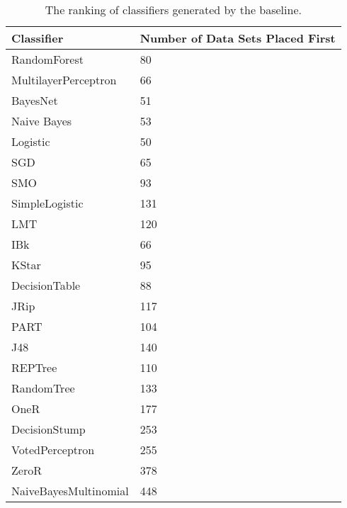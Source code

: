 \begin{table}[h]
\centering
	\begin{tabularx}{\textwidth}{X | X}
		Classifier				&	Number of Data Sets Placed First \\	\hline
		RandomForest				&	80								\\	\hline
		MultilayerPerceptron		&	66								\\	\hline
		BayesNet					&	51								\\	\hline
		Naive Bayes				&	53								\\	\hline	
		Logistic					&	50								\\	\hline	
		SGD						&	65								\\	\hline
		SMO						&	93								\\	\hline
		SimpleLogistic			&	131								\\	\hline
		LMT						&	120								\\	\hline	
		IBk						&	66								\\	\hline	
		KStar					&	95								\\	\hline	
		DecisionTable			&	88								\\	\hline
		JRip						&	117								\\	\hline
		PART						&	104								\\	\hline
		J48						&	140								\\	\hline	
		REPTree					&	110								\\	\hline
		RandomTree				&	133								\\	\hline	
		OneR						&	177								\\	\hline	
		DecisionStump			&	253								\\	\hline
		VotedPerceptron			&	255								\\	\hline	
		ZeroR					&	378								\\	\hline	
		NaiveBayesMultinomial	&	448								\\	\hline	
	\end{tabularx}
	\caption{The ranking of classifiers generated by the baseline.}
	\label{tab:bestAlgorithmRanking}
\end{table}